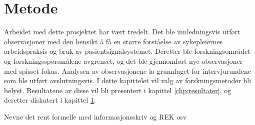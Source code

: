 \chapter{Metode}
\label{chp:metode} 

Arbeidet med dette prosjektet har vært tredelt. Det ble innledningsvis utført observasjoner med den hensikt å få en større forståelse av sykepleiernes arbeidspraksis og bruk av pasientsignalsystemet. Deretter ble forskningsområdet og forskningsspørsmålene avgrenset, og det ble gjennomført nye observasjoner med spisset fokus. Analysen av observasjonene la grunnlaget for intervjurundene som ble utført avslutningsvis. 
I dette kapittelet vil valg av forskningsmetoder bli belyst. Resultatene av disse vil bli presentert i kapittel \ref{chp:resultater}, og deretter diskutert i kapittel \ref{chp:metode}.


\noindent
Nevne det rent formelle med informasjonsskriv og REK osv